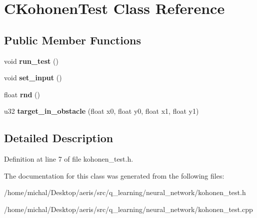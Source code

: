 \hypertarget{classCKohonenTest}{\section{C\-Kohonen\-Test Class Reference}
\label{classCKohonenTest}
}
\subsection*{Public Member Functions}
\begin{DoxyCompactItemize}
\item 
\hypertarget{classCKohonenTest_a66404dc0d2512509a566f619b521ffee}{void {\bfseries run\-\_\-test} ()}\label{classCKohonenTest_a66404dc0d2512509a566f619b521ffee}

\item 
\hypertarget{classCKohonenTest_a2d7b2752303efe3e28b905b35df5a2c9}{void {\bfseries set\-\_\-input} ()}\label{classCKohonenTest_a2d7b2752303efe3e28b905b35df5a2c9}

\item 
\hypertarget{classCKohonenTest_ad48f39d2351063ac4a8ea8a3816551bf}{float {\bfseries rnd} ()}\label{classCKohonenTest_ad48f39d2351063ac4a8ea8a3816551bf}

\item 
\hypertarget{classCKohonenTest_aedf893049bc87d34bb943ef80d2f354f}{u32 {\bfseries target\-\_\-in\-\_\-obstacle} (float x0, float y0, float x1, float y1)}\label{classCKohonenTest_aedf893049bc87d34bb943ef80d2f354f}

\end{DoxyCompactItemize}


\subsection{Detailed Description}


Definition at line 7 of file kohonen\-\_\-test.\-h.



The documentation for this class was generated from the following files\-:\begin{DoxyCompactItemize}
\item 
/home/michal/\-Desktop/aeris/src/q\-\_\-learning/neural\-\_\-network/kohonen\-\_\-test.\-h\item 
/home/michal/\-Desktop/aeris/src/q\-\_\-learning/neural\-\_\-network/kohonen\-\_\-test.\-cpp\end{DoxyCompactItemize}
